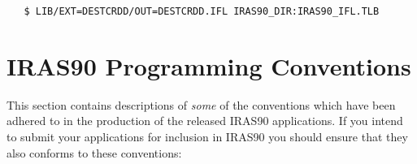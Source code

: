 \documentclass[twoside,11pt]{article}
\newcommand{\xlabel}[1]{}
\begin{document}
\small
\begin{verbatim}
   $ LIB/EXT=DESTCRDD/OUT=DESTCRDD.IFL IRAS90_DIR:IRAS90_IFL.TLB
\end{verbatim}
\normalsize

\section{IRAS90 Programming Conventions
\xlabel{iras90_programming_conventions}\label{SEC:CONV}}

This section contains descriptions of {\em some} of the conventions
which have been adhered to in the production of the released {\small
IRAS90} applications.  If you intend to submit your applications for
inclusion in {\small IRAS90} you should ensure that they also conforms
to these conventions:
\end{document}
